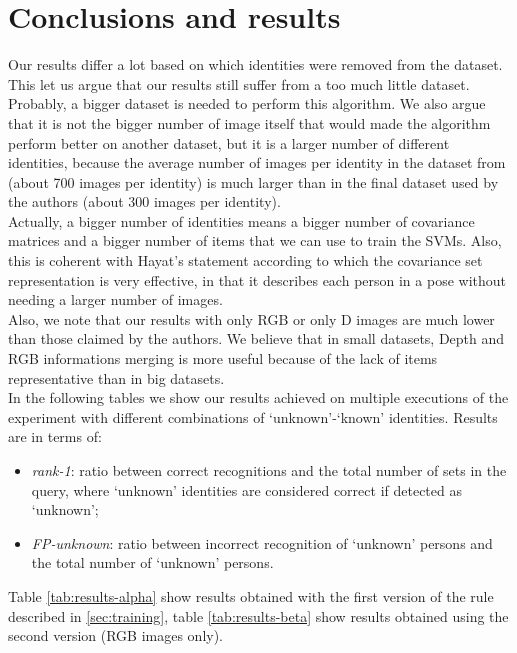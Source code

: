 \documentclass{article}
\begin{document}
\section{Conclusions and results}
Our results differ a lot based on which identities were removed from the
dataset.
\\
This let us argue that our results still suffer from a too much little dataset.
Probably, a bigger dataset is needed to perform this algorithm. We also argue
that it is not the bigger number of image itself that would made the algorithm
perform better on another dataset, but it is a larger number of different
identities, because the average number of images per identity in the dataset
from \citet{Fanelli2013} (about 700 images per identity) is much larger than in
the final dataset used by the authors (about 300 images per identity).
\\
Actually, a bigger number of identities means a bigger number of covariance
matrices and a bigger number of items that we can use to train the SVMs. Also,
this is coherent with Hayat's statement according to which the covariance set
representation is very effective, in that it describes each person in a pose
without needing a larger number of images.
\\
Also, we note that our results with only RGB or only D images are much lower
than those claimed by the authors. We believe that in small datasets, Depth and
RGB informations merging is more useful because of the lack of items
representative than in big datasets.
\\
In the following tables we show our results achieved on multiple executions of
the experiment with different combinations of `unknown'-`known' identities.
Results are in terms of:
\begin{itemize}
	\item \textit{rank-1}: ratio between correct recognitions and the total
		number of sets in the query, where `unknown' identities are
		considered correct if detected as `unknown';
	\item \textit{FP-unknown}: ratio between incorrect recognition of
		`unknown' persons and the total number of `unknown' persons.
\end{itemize}
Table \ref{tab:results-alpha} show results obtained with the first version of
the rule described in \ref{sec:training}, table \ref{tab:results-beta} show
results obtained using the second version (RGB images only).
\end{document}
